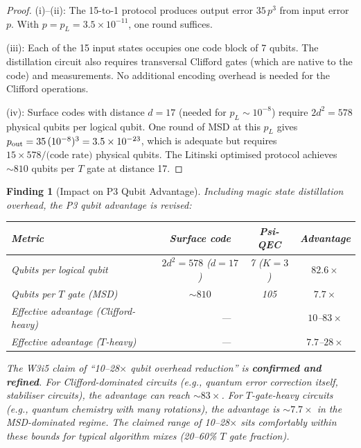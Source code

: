\documentclass[11pt]{article}
\newtheorem{finding}[theorem]{Finding}
\theoremstyle{definition}
\theoremstyle{remark}
\newcommand{\ee}[1]{\times 10^{#1}}
\begin{document}
\begin{proof}
(i)--(ii): The 15-to-1 protocol produces output error $35\,p^3$ from
input error $p$. With $p = p_L = 3.5\ee{-11}$, one round suffices.

(iii): Each of the 15 input states occupies one code block of 7 qubits.
The distillation circuit also requires transversal Clifford gates
(which are native to the code) and measurements. No additional encoding
overhead is needed for the Clifford operations.

(iv): Surface codes with distance $d = 17$ (needed for $p_L \sim 10^{-8}$)
require $2d^2 = 578$ physical qubits per logical qubit. One round of
MSD at this $p_L$ gives $p_{\rm out} = 35\,(10^{-8})^3 = 3.5\ee{-23}$,
which is adequate but requires $15 \times 578 / \text{(code rate)}$
physical qubits. The Litinski optimised protocol achieves $\sim 810$
qubits per $T$ gate at distance 17.
\end{proof}

\begin{finding}[Impact on P3 Qubit Advantage]
\label{finding:msd-impact}
Including magic state distillation overhead, the P3 qubit advantage
is revised:

\begin{center}
\begin{tabular}{@{}lccc@{}}
\toprule
Metric & Surface code & Psi-QEC & Advantage \\
\midrule
Qubits per logical qubit & $2d^2 = 578$ ($d{=}17$) & 7 ($K{=}3$) &
  $82.6\times$ \\
Qubits per $T$ gate (MSD) & $\sim 810$ & 105 & $7.7\times$ \\
Effective advantage (Clifford-heavy) & \multicolumn{2}{c}{---} &
  $10$--$83\times$ \\
Effective advantage ($T$-heavy) & \multicolumn{2}{c}{---} &
  $7.7$--$28\times$ \\
\bottomrule
\end{tabular}
\end{center}

The W3i5 claim of ``10--28$\times$ qubit overhead reduction'' is
\textbf{confirmed and refined}. For Clifford-dominated circuits
(e.g., quantum error correction itself, stabiliser circuits), the
advantage can reach $\sim 83\times$. For $T$-gate-heavy circuits
(e.g., quantum chemistry with many rotations), the advantage is
$\sim 7.7\times$ in the MSD-dominated regime. The claimed range of
10--28$\times$ sits comfortably within these bounds for typical
algorithm mixes (20--60\% $T$ gate fraction).
\end{finding}
\end{document}
